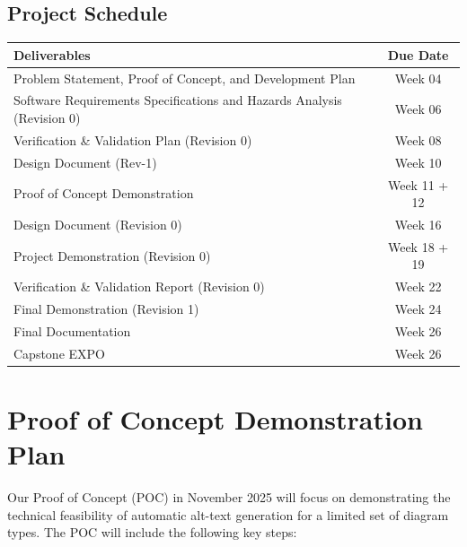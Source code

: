 \documentclass{article}
\begin{document}
\subsection{Project Schedule}
\begin{center}
  \begin{tabularx}{\textwidth}{Xc}
    \toprule
    \textbf{Deliverables} & \textbf{Due Date} \\
    \midrule
    Problem Statement, Proof of Concept, and Development Plan & Week  04 \\
    Software Requirements Specifications and Hazards Analysis (Revision 0) & Week 06 \\
    Verification \& Validation Plan (Revision 0) & Week 08 \\
    Design Document (Rev-1) & Week 10 \\
    Proof of Concept Demonstration & Week 11 + 12 \\
    Design Document (Revision 0) & Week 16 \\
    Project Demonstration (Revision 0) & Week 18 + 19 \\
    Verification \& Validation Report (Revision 0) & Week 22 \\
    Final Demonstration (Revision 1) & Week 24 \\
    Final Documentation & Week 26 \\
    Capstone EXPO & Week 26 \\
    \bottomrule
  \end{tabularx}
\end{center}

\section{Proof of Concept Demonstration Plan}

Our Proof of Concept (POC) in November 2025 will focus on demonstrating the technical feasibility of automatic alt-text generation for a limited set of diagram types. The POC will include the following key steps:
\end{document}
